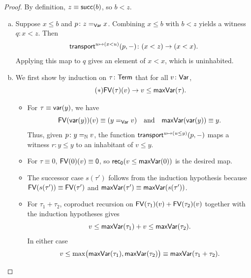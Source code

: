 \begin{proof}
    By definition, $z\equiv\mathsf{succ}(b)$, so $b<z$.
    \begin{enumerate}[a),font=\upshape]
        \item Suppose $x\le b$ and $p\colon z\eq{\fun{Var}}x$. Combining $x\le b$ with $b<z$ yields a witness $q\colon x<z$. Then
        \[
            \fun{transport}^{u\mapsto(x<u)}(p,\dummy)\colon (x<z)\to(x<x).
        \]
        Applying this map to $q$ gives an element of $x<x$, which is uninhabited.
        \item We first show by induction on $\tau\colon\fun{Term}$ that for all $v\colon\fun{Var}$,
        \begin{equation}\label{eq:maxVar-inequality}
            \tag{$\ast$}
            \mathsf{FV}(\tau)(v)\to v\le\mathsf{maxVar}(\tau).
        \end{equation}

        \begin{itemize}
            \item For $\tau\equiv\mathsf{var}(y)$, we have 
            \[
                \mathsf{FV}(\mathsf{var}(y))(v)
                    \equiv(y\mathrel{=_{\mathsf{Var}}}v)
                \quad\text{and}\quad
                \mathsf{maxVar}(\mathsf{var}(y))\equiv y.
            \]
            Thus, given $p\colon y\eq\N v$, the function $\mathsf{transport}^{u\mapsto(u\le y)}(p,{\mathord-})$ maps a witness $r\colon y\le y$ to an inhabitant of $v\le y$.

            \item For $\tau\equiv 0$, $\mathsf{FV}(0)(v)\equiv\mathsf{0}$, so $\mathsf{rec}_{\mathsf{0}}(v\le\mathsf{maxVar}(0))$ is the desired map.

            \item The successor case $s(\tau')$ follows from the induction hypothesis because $\mathsf{FV}(s(\tau'))\equiv\mathsf{FV}(\tau')$ and $\mathsf{maxVar}(\tau')\equiv\mathsf{maxVar}(s(\tau'))$.

            \item For $\tau_1+\tau_2$, coproduct recursion on $\mathsf{FV}(\tau_1)(v)+\mathsf{FV}(\tau_2)(v)$ together with the induction hypotheses gives
            \[
                v\le\mathsf{maxVar}(\tau_1)
                +
                v\le\mathsf{maxVar}(\tau_2).
            \]
            In either case
            \[
                v\le\max\bigl(
                    \mathsf{maxVar}(\tau_1),\mathsf{maxVar}(\tau_2)
                \bigr)
                \equiv
                \mathsf{maxVar}(\tau_1+\tau_2). 
            \]
            

\end{itemize}
\end{enumerate}
\end{proof}
